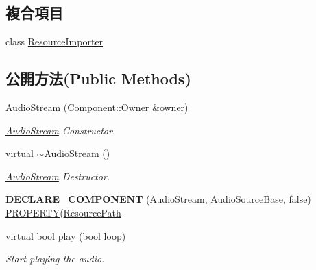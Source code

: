 \subsection*{複合項目}
\begin{DoxyCompactItemize}
\item 
class \hyperlink{class_magnum_1_1_audio_stream_1_1_resource_importer}{Resource\+Importer}
\end{DoxyCompactItemize}
\subsection*{公開方法(Public Methods)}
\begin{DoxyCompactItemize}
\item 
\hyperlink{class_magnum_1_1_audio_stream_a864a5222a35e09b87c4dbe5047fefc50}{Audio\+Stream} (\hyperlink{class_magnum_1_1_component_1_1_owner}{Component\+::\+Owner} \&owner)
\begin{DoxyCompactList}\small\item\em \hyperlink{class_magnum_1_1_audio_stream}{Audio\+Stream} Constructor. \end{DoxyCompactList}\item 
virtual \hyperlink{class_magnum_1_1_audio_stream_a480e5d3468bfe9357dd6c40649b1e449}{$\sim$\+Audio\+Stream} ()
\begin{DoxyCompactList}\small\item\em \hyperlink{class_magnum_1_1_audio_stream}{Audio\+Stream} Destructor. \end{DoxyCompactList}\item 
{\bfseries D\+E\+C\+L\+A\+R\+E\+\_\+\+C\+O\+M\+P\+O\+N\+E\+NT} (\hyperlink{class_magnum_1_1_audio_stream}{Audio\+Stream}, \hyperlink{class_magnum_1_1_audio_source_base}{Audio\+Source\+Base}, false) \hyperlink{class_magnum_1_1_component_a30a9f5cf6e5c94519c752f30ac3c6013}{P\+R\+O\+P\+E\+R\+TY}(\hyperlink{class_magnum_1_1_resource_path}{Resource\+Path}\hypertarget{class_magnum_1_1_audio_stream_a898db07ef6583db564f68d4b9992d240}{}\label{class_magnum_1_1_audio_stream_a898db07ef6583db564f68d4b9992d240}

\item 
virtual bool \hyperlink{class_magnum_1_1_audio_stream_afe27165ca951ac7e01914065ffecf741}{play} (bool loop)
\begin{DoxyCompactList}\small\item\em Start playing the audio. \end{DoxyCompactList}\end{DoxyCompactItemize}
